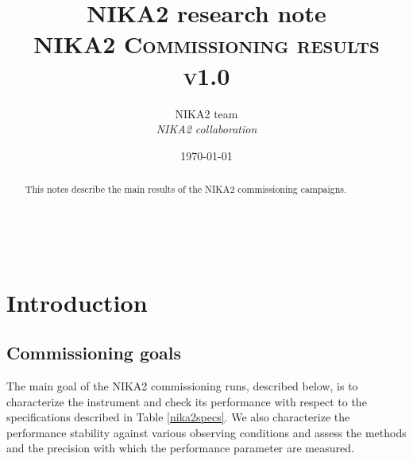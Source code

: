 \documentclass[a4paper, 11pt]{article} %
\title{\textbf{NIKA2 research note}\\   
\textsc{NIKA2 Commissioning results v1.0}} %
\author{NIKA2 team %
\\{\textit{NIKA2 collaboration}}} %
\date{\today} %
\makeatletter
\renewcommand{\maketitle}{ %
\begin{flushleft} %
{\LARGE\@title} %

\vspace{50pt} %

{\large\@author} %
\\\@date %

\vspace{40pt} %
\end{flushleft}
}
\makeatother
\begin{document}
\maketitle %
%
%
%
\tableofcontents

\newpage
\begin{abstract}
This notes describe the main results of the NIKA2 commissioning campaigns.
\end{abstract}



\newpage
%
%



\section{Introduction}

\subsection{Commissioning goals}
The main goal of the NIKA2 commissioning runs, described below, is to 
characterize the instrument and check its 
performance with respect to the specifications 
described in Table \ref{nika2specs}. 
We also characterize the performance stability 
against various observing conditions and 
assess the methods and the precision with which the performance parameter are measured.
\end{document}
